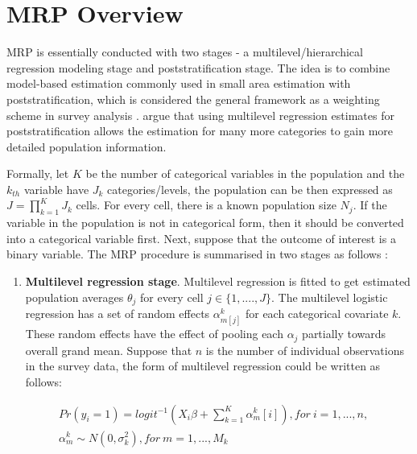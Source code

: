 \documentclass{monashthesis}
\begin{document}
\hypertarget{overview}{%
\section{MRP Overview}\label{overview}}

MRP is essentially conducted with two stages - a multilevel/hierarchical regression modeling stage and poststratification stage. The idea is to combine model-based estimation commonly used in small area estimation with poststratification, which is considered the general framework as a weighting scheme in survey analysis \autocite{Gelman97poststratificationinto}. \textcite{Gelman97poststratificationinto} argue that using multilevel regression estimates for poststratification allows the estimation for many more categories to gain more detailed population information.

Formally, let \(K\) be the number of categorical variables in the population and the \(k_{th}\) variable have \(J_k\) categories/levels, the population can be then expressed as \(J = \prod_{k=1}^K J_k\) cells. For every cell, there is a known population size \(N_j\). If the variable in the population is not in categorical form, then it should be converted into a categorical variable first. Next, suppose that the outcome of interest is a binary variable. The MRP procedure is summarised in two stages as follows \autocite{GaoYuxiang2021IMRa}:

\begin{enumerate}
\def\labelenumi{\arabic{enumi}.}
\tightlist
\item
  \textbf{Multilevel regression stage}. Multilevel regression is fitted to get estimated population averages \(\theta_j\) for every cell \(j \in \{1, ...., J\}\). The multilevel logistic regression has a set of random effects \(\alpha^k_{m[j]}\) for each categorical covariate \(k\). These random effects have the effect of pooling each \(\alpha_j\) partially towards overall grand mean. Suppose that \(n\) is the number of individual observations in the survey data, the form of multilevel regression could be written as follows:
\end{enumerate}

\begin{equation} 
\begin{split}
& Pr(y_i = 1) = logit^{-1}\left(X_i\beta + \sum^K_{k=1}\alpha^k_m[i]\right), for\ i=1, ..., n,\\
& \alpha^k_m \sim N(0, \sigma^2_k), for\ m = 1, ..., M_k
\end{split}
\label{eq:mrp-stage1}
\end{equation}
\end{document}
